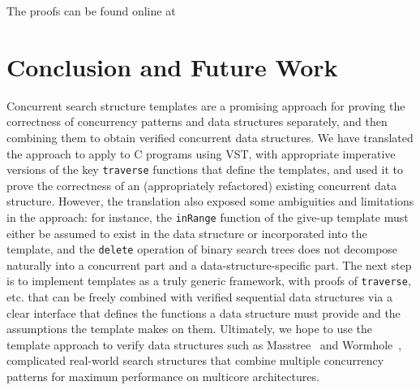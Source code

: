 \documentclass[a4paper,UKenglish,cleveref, autoref, thm-restate]{lipics-v2021}
\newcommand{\wm}[1]{\textbf{\textcolor{violet}{[William: #1]}}}
\begin{document}
The proofs can be found online at

\href{https://github.com/PrincetonUniversity/DeepSpecDB/tree/master/concurrency/templates}{\color{blue}{https://github.com/PrincetonUniversity/DeepSpecDB/tree/master/concurrency/templates}}

\section{Conclusion and Future Work}
Concurrent search structure templates are a promising approach for proving the correctness of concurrency patterns and data structures separately, and then combining them to obtain verified concurrent data structures. We have translated the approach to apply to C programs using VST, with appropriate imperative versions of the key \lstinline{traverse} functions that define the templates, and used it to prove the correctness of an (appropriately refactored) existing concurrent data structure. However, the translation also exposed some ambiguities and limitations in the approach: for instance, the \lstinline{inRange} function of the give-up template must either be assumed to exist in the data structure or incorporated into the template, and the \lstinline{delete} operation of binary search trees does not decompose naturally into a concurrent part and a data-structure-specific part.  %
The next step is to implement templates as a truly generic framework, with proofs of \lstinline{traverse}, etc. that can be freely combined with verified sequential data structures via a clear interface that defines the functions a data structure must provide and the assumptions the template makes on them.
Ultimately, we hope to use the template approach to verify data structures such as Masstree~\cite{masstree} and Wormhole~\cite{wormhole}, complicated real-world search structures that combine multiple concurrency patterns for maximum performance on multicore architectures.


\newpage




\end{document}
